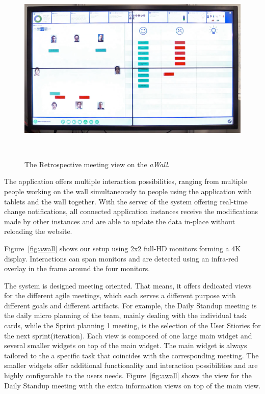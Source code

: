 \documentclass{sigchi}
\begin{document}
\begin{figure}
	\centering
	\includegraphics[width=\columnwidth]{figures/retrospective}
	\caption{The Retrospective meeting view on the \textit{aWall}.}
	~\label{fig:retrospective}
\end{figure}

The application offers multiple interaction possibilities, ranging from multiple people working on the wall simultaneously to people using the application with tablets and the wall together.
With the server of the system offering real-time change notifications, all connected application instances receive the modifications made by other instances and are able to update the data in-place without reloading the website.

Figure~\ref{fig:awall} shows our setup using 2x2 full-HD monitors forming a 4K display.
Interactions can span monitors and are detected using an infra-red overlay in the frame around the four monitors.

The system is designed meeting oriented. That means, it offers dedicated views for the different agile meetings, which each serves a different purpose with different goals and different artifacts. For example, the Daily Standup meeting is the daily micro planning of the team, mainly dealing with the individual task cards, while the Sprint planning 1 meeting, is the selection of the User Stiories for the next sprint(iteration).
Each view is composed of one large main widget and several smaller widgets on top of the main widget.
The main widget is always tailored to the a specific task that coincides with the corresponding meeting.
The smaller widgets offer additional functionality and interaction possibilities and are highly configurable to the users needs.
Figure~\ref{fig:awall} shows the view for the Daily Standup meeting with the extra information views on top of the main view.
\end{document}

